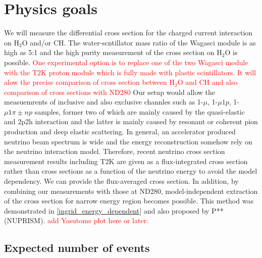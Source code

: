 \section{Physics goals}
We will measure the differential cross section for the charged current interaction on $\mathrm{H_2O}$ and/or CH.
The water-scntillator mass ratio of the Wagasci module is as high as 5:1 and the high purity measurement
of the cross section on $\mathrm{H_2O}$ is possible.
\textcolor{red}{One experimental option is to replace one of the two Wagasci module with the T2K proton module
  which is fully made with plastic scintillators. It will alow the precise comparison
  of cross section between $\mathrm{H_2O}$ and CH and also comparison of cross sections with ND280}
Our setup would allow the measuemrents of inclusive and also exclusive channles such as
1-$\mu$, 1-$\mu 1p$, 1-$\mu 1\pi{\pm} np$ samples, former two of which are mainly caused by the quasi-elastic and
2p2h interaction and the latter is mainly caused by resonant or coherent pion production and deep elastic scattering.
In general, an accelerator produced neutrino beam spectrum is wide and the energy reconstruction
somehow rely on the neutrino interaction model.
Therefore, recent neutrino cross section measurement results including T2K are given as a flux-integrated cross section
rather than cross sections as a function of the neutrino energy to avoid the model dependency.
We can provide the flux-averaged cross section.
In addition, by combining our measurements with those at ND280, model-independent extraction of the cross section
for narrow energy region becomes possible.
This method was demonstrated in \ref{ingrid_energy_dependent} and also proposed by P** (NUPRISM).
\textcolor{red}{add Yasutome plot here or later.}
\subsection{Expected number of events}
